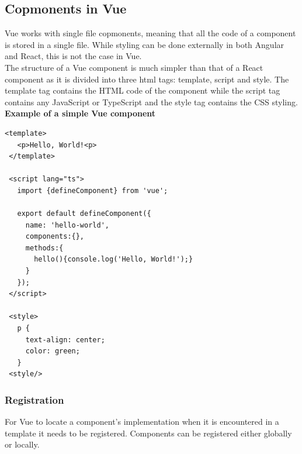 \subsection{Copmonents in Vue}
Vue works with single file copmonents, meaning that all the code of a component is stored in a single file. While styling can be done externally in both Angular and React, this is not the case in Vue.\\[0.5cm]
The structure of a Vue component is much simpler than that of a React component as it is divided into three html tags: template, script and style. The template tag contains the HTML code of the component while the script tag contains any JavaScript or TypeScript and the style tag contains the CSS styling.\\[0.5cm]
\textbf{Example of a simple Vue component}
\begin{Verbatim}[frame=single]
 <template>
   <p>Hello, World!<p>
 </template>
 
 <script lang="ts">
   import {defineComponent} from 'vue';
   
   export default defineComponent({
     name: 'hello-world',
     components:{},
     methods:{
       hello(){console.log('Hello, World!');}
     }
   });
 </script>
 
 <style>
   p {
     text-align: center;
     color: green;
   }
 <style/>
\end{Verbatim}
\subsubsection{Registration}
For Vue to locate a component's implementation when it is encountered in a template it needs to be registered.
Components can be registered either globally or locally.








